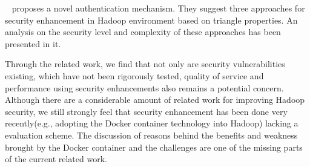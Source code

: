 ~\cite{sadasivam2012novel} proposes a novel authentication mechanism. They suggest three approaches for security enhancement in Hadoop environment based on triangle properties. An analysis on the security level and complexity of these approaches has been presented in it. 

Through the related work, we find that not only are security vulnerabilities existing, which have not been rigorously tested, quality of service and performance using security enhancements also remains a potential concern. Although there are a considerable amount of related work for improving Hadoop security, we still strongly feel that security enhancement has been done very recently(e.g., adopting the Docker container technology into Hadoop) lacking a evaluation scheme. The discussion of reasons behind the benefits and weakness brought by the Docker container and the challenges are one of the missing parts of the current related work.